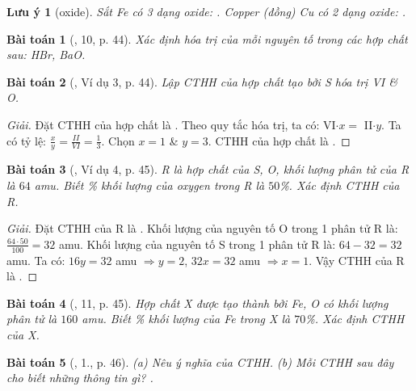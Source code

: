 \documentclass{article}
\newtheorem{baitoan}{Bài toán}
\newtheorem{luuy}{Lưu ý}
\begin{document}
\begin{luuy}[oxide]
	Sắt \emph{Fe} có 3 dạng oxide: \emph{}. Copper (đồng) \emph{Cu} có 2 dạng oxide: \emph{}.
\end{luuy}

\begin{baitoan}[\cite{SGK_KHTN_7_Canh_Dieu}, 10, p. 44]
	Xác định hóa trị của mỗi nguyên tố trong các hợp chất sau: \emph{HBr, BaO}.
\end{baitoan}

\begin{baitoan}[\cite{SGK_KHTN_7_Canh_Dieu}, Ví dụ 3, p. 44]
	Lập {\rm CTHH} của hợp chất tạo bởi \emph{S} hóa trị VI \& \emph{O}.
\end{baitoan}

\begin{proof}[Giải]
	Đặt {\rm CTHH} của hợp chất là . Theo quy tắc hóa trị, ta có: VI$\cdot x =$ II$\cdot y$. Ta có tỷ lệ: $\frac{x}{y} = \frac{II}{VI} = \frac{1}{3}$. Chọn $x = 1$ \& $y = 3$. {\rm CTHH} của hợp chất là .
\end{proof}

\begin{baitoan}[\cite{SGK_KHTN_7_Canh_Dieu}, Ví dụ 4, p. 45]
	R là hợp chất của \emph{S, O}, khối lượng phân tử của R là $64$ amu. Biết \% khối lượng của oxygen trong R là $50$\%. Xác định {\rm CTHH} của R.
\end{baitoan}

\begin{proof}[Giải]
	Đặt {\rm CTHH} của R là . Khối lượng của nguyên tố O trong 1 phân tử R là: $\frac{64\cdot50}{100} = 32$ amu. Khối lượng của nguyên tố S trong 1 phân tử R là: $64 - 32 = 32$ amu. Ta có: $16y = 32$ amu $\Rightarrow y = 2$, $32x = 32$ amu $\Rightarrow x = 1$. Vậy {\rm CTHH} của R là .
\end{proof}

\begin{baitoan}[\cite{SGK_KHTN_7_Canh_Dieu}, 11, p. 45]
	Hợp chất X được tạo thành bởi \emph{Fe, O} có khối lượng phân tử là $160$ amu. Biết \% khối lượng của \emph{Fe} trong X là $70$\%. Xác định {\rm CTHH} của X.
\end{baitoan}

\begin{baitoan}[\cite{SGK_KHTN_7_Canh_Dieu}, 1., p. 46]
	(a) Nêu ý nghĩa của {\rm CTHH}. (b) Mỗi {\rm CTHH} sau đây cho biết những thông tin gì? \emph{}.
\end{baitoan}
\end{document}
